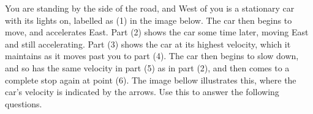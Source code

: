 \documentclass[12pt]{exam}
\begin{document}
\begin{questions}
	
	\clearpage
	\question You are standing by the side of the road, and West of you is a stationary car with its lights on, labelled as (1) in the image below. The car then begins to move, and accelerates East. Part (2) shows the car some time later, moving East and still accelerating. Part (3) shows the car at its highest velocity, which it maintains as it moves past you to part (4). The car then begins to slow down, and so has the same velocity in part (5) as in part (2), and then comes to a complete stop again at point (6). The image bellow illustrates this, where the car's velocity is indicated by the arrows. Use this to answer the following questions.
\vspace{0.1in}
\begin{center}

\end{center}
\vspace{0.1in}


\end{questions}
\end{document}
